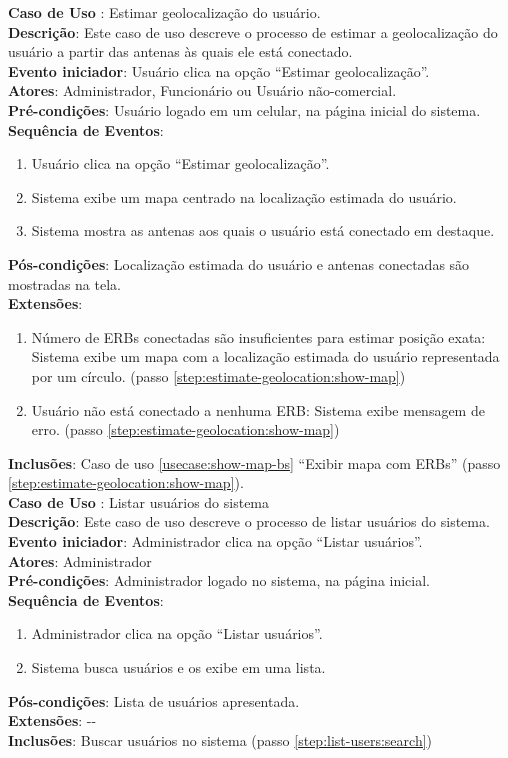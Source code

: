 \documentclass[]{politex}
\begin{document}
\noindent \textbf{Caso de Uso }: Estimar
geolocalização do usuário. \\
\textbf{Descrição}: Este caso de uso descreve o processo de estimar a
geolocalização do usuário a partir das antenas às quais ele está conectado. \\
\textbf{Evento iniciador}: Usuário clica na opção ``Estimar geolocalização''. \\
\textbf{Atores}: Administrador, Funcionário ou Usuário não-comercial. \\
\textbf{Pré-condições}: Usuário logado em um celular, na página inicial do
sistema. \\
\textbf{Sequência de Eventos}:
\begin{enumerate}
\item Usuário clica na opção ``Estimar geolocalização''.
\item\label{step:estimate-geolocation:show-map} Sistema exibe um mapa centrado
na localização estimada do usuário.
\item Sistema mostra as antenas aos quais o usuário está conectado em destaque.
\end{enumerate}
\textbf{Pós-condições}: Localização estimada do usuário e antenas conectadas são
mostradas na tela. \\
\textbf{Extensões}:
\begin{enumerate}
\item Número de ERBs conectadas são insuficientes para estimar posição exata:
Sistema exibe um mapa com a localização estimada do usuário representada por um
círculo. (passo \ref{step:estimate-geolocation:show-map})
\item Usuário não está conectado a nenhuma ERB: Sistema exibe mensagem de erro.
(passo \ref{step:estimate-geolocation:show-map})
\end{enumerate}
\textbf{Inclusões}: Caso de uso \ref{usecase:show-map-bs} ``Exibir mapa com
ERBs'' (passo \ref{step:estimate-geolocation:show-map}). \\

\noindent \textbf{Caso de Uso }: Listar usuários do
sistema \\
\textbf{Descrição}: Este caso de uso descreve o processo de listar usuários do
sistema. \\
\textbf{Evento iniciador}: Administrador clica na opção ``Listar usuários''. \\
\textbf{Atores}: Administrador \\
\textbf{Pré-condições}: Administrador logado no sistema, na página inicial. \\
\textbf{Sequência de Eventos}:
\begin{enumerate}
\item Administrador clica na opção ``Listar usuários''.
\item\label{step:list-users:search} Sistema busca usuários e os exibe em uma
lista.
\end{enumerate}
\textbf{Pós-condições}: Lista de usuários apresentada. \\
\textbf{Extensões}: -{}- \\
\textbf{Inclusões}: Buscar usuários no sistema (passo
\ref{step:list-users:search}) \\
\end{document}
